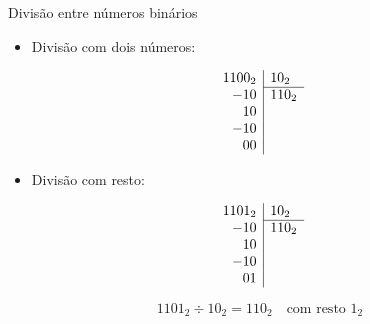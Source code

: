 
\begin{frame}{Divisão entre números binários} 
    \begin{itemize} 
        \item Divisão com dois números: 
    \end{itemize} \[ 
    \begin{array}{r|l} 1100_{2} & 10_{2} \\ \cline{2-2} -10 & 110_{2} \\ \phantom{-}10 & \\ -10 & \\ \phantom{-}00 & \\ \end{array} \] 
    \begin{itemize}
        \item Divisão com resto:
    \end{itemize} \[
    \begin{array}{r|l}
        1101_{2} & 10_{2} \\
        \cline{2-2}
        -10      & 110_{2} \\
        \phantom{-}10 & \\
        -10      & \\
        \phantom{-}01 & \\
    \end{array}
    \]

    \[
        1101_{2} \div 10_{2}
        = 110_{2}
        \quad \text{com resto } 1_{2}
    \]
\end{frame}